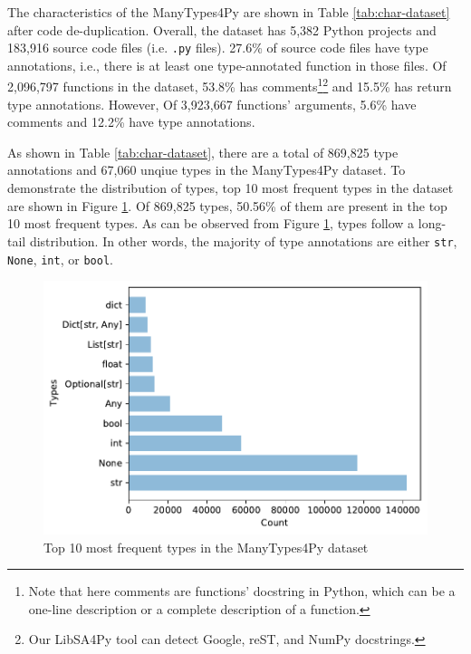 \documentclass[10pt, conference]{IEEEtran}
\begin{document}
The characteristics of the ManyTypes4Py are shown in Table \ref{tab:char-dataset} after code de-duplication. Overall, the dataset has 5,382 Python projects and 183,916 source code files (i.e. \texttt{.py} files). 27.6\% of source code files have type annotations, i.e., there is at least one type-annotated function in those files. Of 2,096,797 functions in the dataset, 53.8\% has comments\footnote{Note that here comments are functions' docstring in Python, which can be a one-line description or a complete description of a function.}\footnote{Our LibSA4Py tool can detect Google, reST, and NumPy docstrings.} and 15.5\% has return type annotations. However, Of 3,923,667 functions' arguments, 5.6\% have comments and 12.2\% have type annotations.

As shown in Table \ref{tab:char-dataset}, there are a total of 869,825 type annotations and 67,060 unqiue types in the ManyTypes4Py dataset. To demonstrate the distribution of types, top 10 most frequent types in the dataset are shown in Figure \ref{fig:top-10-types}. Of 869,825 types, 50.56\% of them are present in the top 10 most frequent types. As can be observed from Figure \ref{fig:top-10-types}, types follow a long-tail distribution. In other words, the majority of type annotations are either \texttt{str}, \texttt{None}, \texttt{int}, or \texttt{bool}.

\begin{figure}[!t]
	\centering
	\includegraphics[width=\linewidth]{figs/top-10-most-frequent-types.pdf}
	\caption{Top 10 most frequent types in the ManyTypes4Py dataset}
	\label{fig:top-10-types}
\end{figure}
\end{document}
